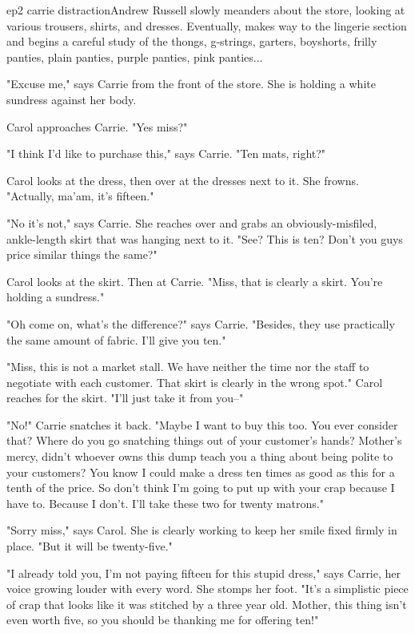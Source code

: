 \documentclass{book}
\begin{document}
\begin{childnode}{ep2 carrie distraction}{Andrew Russell}
    \name{} slowly meanders about the store, looking at various trousers, shirts, and dresses. Eventually, \heshe{} makes \hisher{} way to the lingerie section and begins a careful study of the
    thongs, g-strings, garters, boyshorts, frilly panties, plain panties, purple panties, pink panties...

    "Excuse me," says Carrie from the front of the store. She is holding a white sundress against her body. 

    Carol approaches Carrie. "Yes miss?"

    "I think I'd like to purchase this," says Carrie.  "Ten mats, right?"

    Carol looks at the dress, then over at the dresses next to it. She frowns. "Actually, ma'am, it's fifteen."

    "No it's not," says Carrie. She reaches over and grabs an obviously-misfiled, ankle-length skirt that was hanging next to it. "See? This is ten? Don't you guys price similar things the same?"
   
    Carol looks at the skirt. Then at Carrie. "Miss, that is clearly a skirt. You're holding a sundress."

    "Oh come on, what's the difference?" says Carrie. "Besides, they use practically the same amount of fabric. I'll give you ten."

    "Miss, this is not a market stall. We have neither the time nor the staff to negotiate with each customer. That skirt is clearly in the wrong spot." Carol reaches for the skirt. "I'll just 
    take it from you--"

    "No!" Carrie snatches it back. "Maybe I want to buy this too. You ever consider that? Where do you go snatching things out of your customer's hands? Mother's mercy, didn't whoever owns this
    dump teach you a thing about being polite to your customers? You know I could make a dress ten times as good as this for a tenth of the price. So don't think I'm going to put up with your
    crap because I have to. Because I don't. I'll take these two for twenty matrons."

    "Sorry miss," says Carol. She is clearly working to keep her smile fixed firmly in place. "But it will be twenty-five."

    "I already told you, I'm not paying fifteen for this stupid dress," says Carrie, her voice growing louder with every word. She stomps her foot. "It's a simplistic piece of crap that looks like
    it was stitched by a three year old. Mother, this thing isn't even worth five, so you should be thanking me for offering ten!"


\end{childnode}
\end{document}
